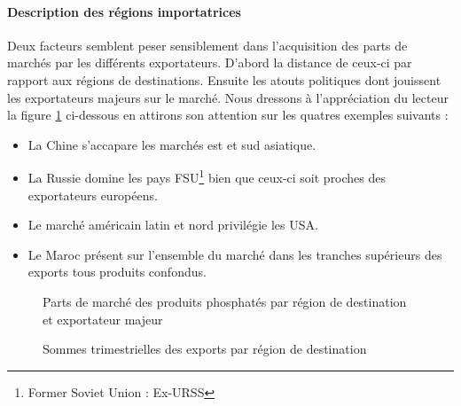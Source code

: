 		\paragraph{Description des régions importatrices\\}
		Deux facteurs semblent peser sensiblement dans l'acquisition des parts de marchés par les différents exportateurs. D'abord la distance de ceux-ci par rapport aux régions de destinations. Ensuite les atouts politiques dont jouissent les exportateurs majeurs sur le marché. Nous dressons à l'appréciation du lecteur la figure \ref{fig:destReg} ci-dessous en attirons son attention sur les quatres exemples suivants :
		\begin{itemize}
		\item La Chine s'accapare les marchés est et sud asiatique. 
		\item La Russie domine les pays FSU\footnote{Former Soviet Union : Ex-URSS} bien que ceux-ci soit proches des exportateurs européens.
		\item Le marché américain latin et nord privilégie les USA.
		\item Le Maroc présent sur l'ensemble du marché dans les tranches supérieurs des exports tous produits confondus.
		\end{itemize}
				\begin{figure}[H]
				\centering
				\caption{Parts de marché des produits phosphatés par région de destination et exportateur majeur}
				\label{fig:destReg}
				\end{figure}	
				\begin{figure}[H]
				\centering
				\caption{Sommes trimestrielles des exports par région de destination}
				\label{fig:compReg}
				\end{figure}

